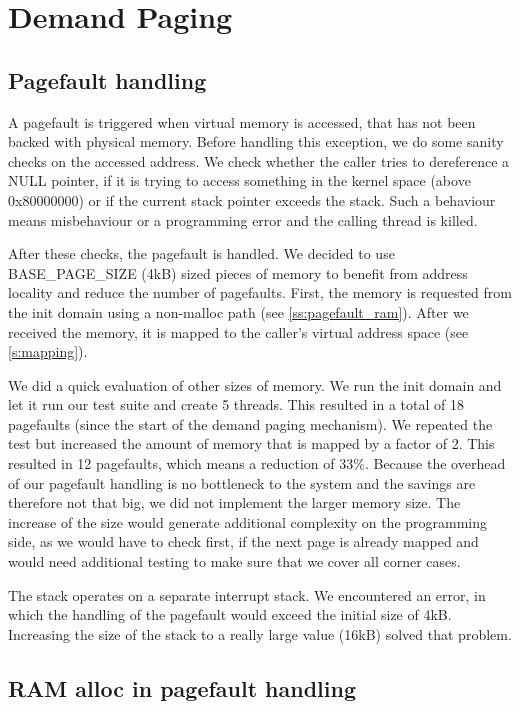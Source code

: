 \section{Demand Paging}\label{s:paging}

\subsection{Pagefault handling}

A pagefault is triggered when virtual memory is accessed, that has not been 
backed with physical memory. Before handling this exception, we do some sanity 
checks on the accessed address. We check whether the caller tries to 
dereference a NULL pointer, if it is trying to access something in the kernel 
space (above 0x80000000) or if the current stack pointer exceeds the stack. 
Such a behaviour means misbehaviour or a programming error and the calling 
thread is killed.
\medskip

After these checks, the pagefault is handled. We decided to use 
BASE\_PAGE\_SIZE (4kB) sized pieces of memory to benefit from address locality 
and reduce the number of pagefaults. First, the memory is requested from the 
init domain using a non-malloc path (see \autoref{ss:pagefault_ram}). After we 
received the memory, it is mapped to the caller's virtual address space (see 
\autoref{s:mapping}).
\medskip

We did a quick evaluation of other sizes of memory. We run the init domain and 
let it run our test suite and create 5 threads. This resulted in a total of 18 
pagefaults (since the start of the demand paging mechanism). We repeated the 
test but increased the amount of memory that is mapped by a factor of 2. This 
resulted in 12 pagefaults, which means a reduction of 33\%. Because the 
overhead of our pagefault handling is no bottleneck to the system and the 
savings are therefore not that big, we did not implement the larger memory 
size. The increase of the size would generate additional complexity on the 
programming side, as we would have to check first, if the next page is already 
mapped and would need additional testing to make sure that we cover all corner 
cases.
\medskip

The stack operates on a separate interrupt stack. We encountered an error, in 
which the handling of the pagefault would exceed the initial size of 4kB. 
Increasing the size of the stack to a really large value (16kB) solved that 
problem.

\subsection{RAM alloc in pagefault handling}\label{ss:pagefault_ram}

